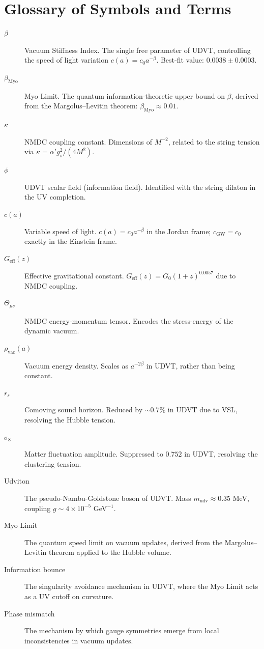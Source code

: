 \documentclass[12pt,a4paper]{book}
\theoremstyle{definition}
\theoremstyle{remark}
\begin{document}
\chapter{Glossary of Symbols and Terms}
\label{app:glossary}

\begin{description}
    \item[$\beta$] Vacuum Stiffness Index. The single free parameter of UDVT, controlling the speed of light variation $c(a) = c_0 a^{-\beta}$. Best-fit value: $0.0038 \pm 0.0003$.
    \item[$\beta_{\mathrm{Myo}}$] Myo Limit. The quantum information-theoretic upper bound on $\beta$, derived from the Margolus--Levitin theorem: $\beta_{\mathrm{Myo}} \approx 0.01$.
    \item[$\kappa$] NMDC coupling constant. Dimensions of $M^{-2}$, related to the string tension via $\kappa = \alpha' g_s^2/(4M^2)$.
    \item[$\phi$] UDVT scalar field (information field). Identified with the string dilaton in the UV completion.
    \item[$c(a)$] Variable speed of light. $c(a) = c_0 a^{-\beta}$ in the Jordan frame; $c_{\mathrm{GW}} = c_0$ exactly in the Einstein frame.
    \item[$G_{\mathrm{eff}}(z)$] Effective gravitational constant. $G_{\mathrm{eff}}(z) = G_0(1+z)^{0.0057}$ due to NMDC coupling.
    \item[$\Theta_{\mu\nu}$] NMDC energy-momentum tensor. Encodes the stress-energy of the dynamic vacuum.
    \item[$\rho_{\mathrm{vac}}(a)$] Vacuum energy density. Scales as $a^{-2\beta}$ in UDVT, rather than being constant.
    \item[$r_s$] Comoving sound horizon. Reduced by $\sim 0.7\%$ in UDVT due to VSL, resolving the Hubble tension.
    \item[$\sigma_8$] Matter fluctuation amplitude. Suppressed to $0.752$ in UDVT, resolving the clustering tension.
    \item[Udviton] The pseudo-Nambu-Goldstone boson of UDVT. Mass $m_{\mathrm{udv}} \approx 0.35$ MeV, coupling $g \sim 4 \times 10^{-5}$ GeV$^{-1}$.
    \item[Myo Limit] The quantum speed limit on vacuum updates, derived from the Margolus--Levitin theorem applied to the Hubble volume.
    \item[Information bounce] The singularity avoidance mechanism in UDVT, where the Myo Limit acts as a UV cutoff on curvature.
    \item[Phase mismatch] The mechanism by which gauge symmetries emerge from local inconsistencies in vacuum updates.
\end{description}
\end{document}
